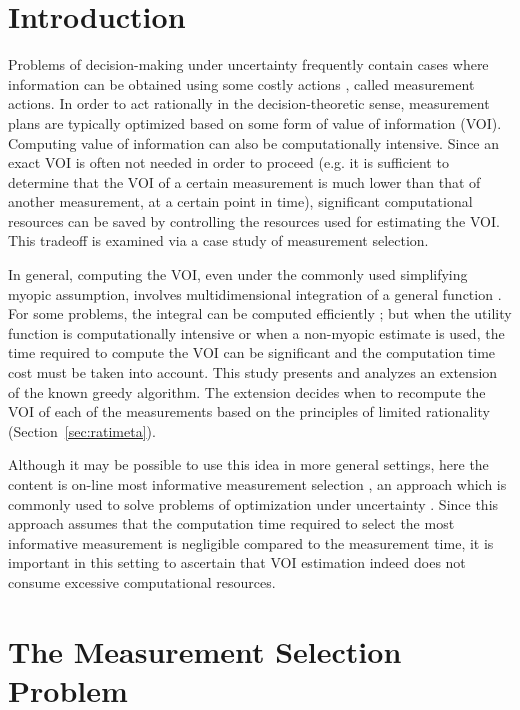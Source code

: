 \section{Introduction}

Problems of decision-making under uncertainty frequently contain cases
where information can be obtained using some costly actions \cite{WicklerPotter.information-gathering}, called
measurement actions. In order to act rationally in the
decision-theoretic sense, measurement plans are typically optimized
based on some form of value of information (VOI). Computing value of
information can also be computationally intensive. Since an exact
VOI is often not needed in
order to proceed (e.g. it is sufficient to determine that the VOI
of a certain measurement is much lower than that of
another measurement, at a certain point in time), significant
computational resources can be saved by controlling the resources used
for estimating the VOI. This tradeoff is examined via a case
study of measurement selection. 

In general, computing the VOI, even under the commonly used
simplifying myopic assumption, involves multidimensional integration
of a general function \cite{Russell.right}. For some problems, the
integral can be computed efficiently \cite{Russell.gametree}; but when
the utility function is computationally intensive or when a non-myopic
estimate is used, the time required to compute the VOI can be
significant \cite{Heckerman.nonmyopic} \cite{BilgicGetoor.voila} and
the computation time cost must be taken into account.  This study
presents and analyzes an extension of the known greedy algorithm. The
extension decides when to recompute the VOI of each of the
measurements based on the principles of limited rationality (Section~\ref{sec:ratimeta}).

Although it may be possible to use this idea in more general settings,
here the content is on-line most informative measurement selection
\cite{Guestrin.submodular} \cite{BilgicGetoor.voila}, an approach
which is commonly used to solve problems of optimization under
uncertainty \cite{Rish.efficient} \cite{Krause.water}. Since this
approach assumes that the computation time required to select the most
informative measurement is negligible compared to the measurement
time, it is important in this setting to ascertain that VOI estimation
indeed does not consume excessive computational resources.

\section{The Measurement Selection Problem}
\label{sec:raticomp-greedy}

